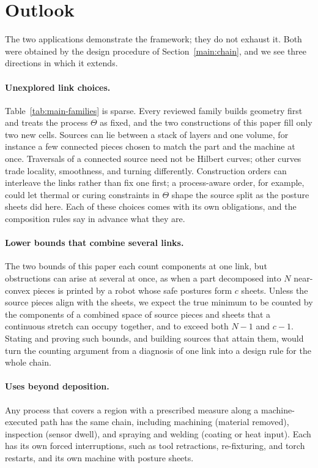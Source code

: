 \section{Outlook}
\label{main:outlook}

The two applications demonstrate the framework; they do not exhaust it. Both were obtained by the design procedure of Section~\ref{main:chain}, and we see three directions in which it extends.

\paragraph{Unexplored link choices.}
Table~\ref{tab:main-families} is sparse. Every reviewed family builds geometry first and treats the process $\Theta$ as fixed, and the two constructions of this paper fill only two new cells. Sources can lie between a stack of layers and one volume, for instance a few connected pieces chosen to match the part and the machine at once. Traversals of a connected source need not be Hilbert curves; other curves trade locality, smoothness, and turning differently. Construction orders can interleave the links rather than fix one first; a process-aware order, for example, could let thermal or curing constraints in $\Theta$ shape the source split as the posture sheets did here. Each of these choices comes with its own obligations, and the composition rules say in advance what they are.

\paragraph{Lower bounds that combine several links.}
The two bounds of this paper each count components at one link, but obstructions can arise at several at once, as when a part decomposed into $N$ near-convex pieces is printed by a robot whose safe postures form $c$ sheets. Unless the source pieces align with the sheets, we expect the true minimum to be counted by the components of a combined space of source pieces and sheets that a continuous stretch can occupy together, and to exceed both $N-1$ and $c-1$. Stating and proving such bounds, and building sources that attain them, would turn the counting argument from a diagnosis of one link into a design rule for the whole chain.

\paragraph{Uses beyond deposition.}
Any process that covers a region with a prescribed measure along a machine-executed path has the same chain, including machining (material removed), inspection (sensor dwell), and spraying and welding (coating or heat input). Each has its own forced interruptions, such as tool retractions, re-fixturing, and torch restarts, and its own machine with posture sheets.
